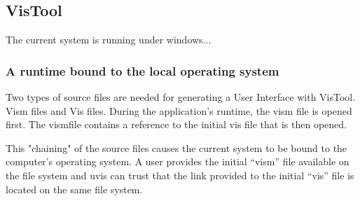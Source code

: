 \subsection{VisTool}

The current system is running under windows...

\subsubsection{A runtime bound to the local operating system}

Two types of source files are needed for generating a User Interface with VisTool. Vism files and Vis files. During the application's runtime, the vism file is opened first. The vismfile contains a reference to the initial vis file that is then opened.

This "chaining" of the source files causes the current system to be bound to the computer's operating system. A user provides the initial ``vism'' file available on the file system and uvis can trust that the link provided to the initial ``vis'' file is located on the same file system.